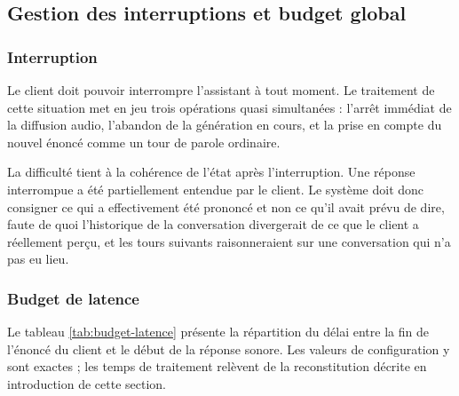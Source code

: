 \subsection{Gestion des interruptions et budget global}

\subsubsection{Interruption}

Le client doit pouvoir interrompre l'assistant à tout moment. Le traitement de cette situation met en jeu trois opérations quasi simultanées : l'arrêt immédiat de la diffusion audio, l'abandon de la génération en cours, et la prise en compte du nouvel énoncé comme un tour de parole ordinaire.

La difficulté tient à la cohérence de l'état après l'interruption. Une réponse interrompue a été partiellement entendue par le client. Le système doit donc consigner ce qui a effectivement été prononcé et non ce qu'il avait prévu de dire, faute de quoi l'historique de la conversation divergerait de ce que le client a réellement perçu, et les tours suivants raisonneraient sur une conversation qui n'a pas eu lieu.

\subsubsection{Budget de latence}

Le tableau \ref{tab:budget-latence} présente la répartition du délai entre la fin de l'énoncé du client et le début de la réponse sonore. Les valeurs de configuration y sont exactes ; les temps de traitement relèvent de la reconstitution décrite en introduction de cette section.

